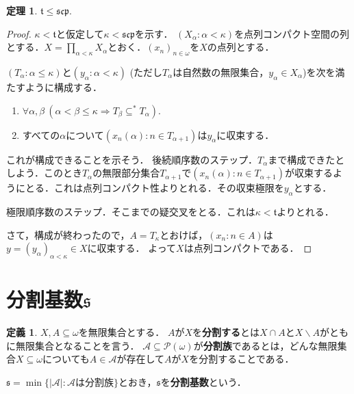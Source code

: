 \documentclass[uplatex,dvipdfmx]{jsarticle}
\newcommand{\frakt}{\mathfrak{t}}
\newcommand{\s}{\mathfrak{s}}
\newcommand{\scp}{\mathfrak{scp}}
\renewcommand\subset{\subseteq}
\renewcommand{\setminus}{\smallsetminus}
\theoremstyle{definition}
\newtheorem{thm}{定理}
\newtheorem*{defi*}{定義}
\theoremstyle{named}
\begin{document}
\begin{thm}
$\frakt \le \scp$.
\end{thm}
\begin{proof}
$\kappa < \frakt$と仮定して$\kappa < \scp$を示す．
$(X_\alpha : \alpha < \kappa)$を点列コンパクト空間の列とする．$X = \prod_{\alpha < \kappa} X_\alpha$とおく．$(x_n)_{n \in \omega}$を$X$の点列とする．

$(T_\alpha : \alpha \le \kappa)$と$(y_\alpha : \alpha < \kappa)$ (ただし$T_\alpha$は自然数の無限集合，$y_\alpha \in X_\alpha$)を次を満たすように構成する．

\begin{enumerate}
    \item $\forall \alpha, \beta \ (\alpha < \beta \le \kappa \Rightarrow T_\beta \subset^* T_\alpha)$.
    \item すべての$\alpha$について$(x_n(\alpha) : n \in T_{\alpha+1})$は$y_\alpha$に収束する．
\end{enumerate}

これが構成できることを示そう．
後続順序数のステップ．$T_\alpha$まで構成できたとしよう．このとき$T_{\alpha}$の無限部分集合$T_{\alpha+1}$で$(x_n(\alpha) : n \in T_{\alpha+1})$が収束するようにとる．これは点列コンパクト性よりとれる．その収束極限を$y_\alpha$とする．

極限順序数のステップ．そこまでの疑交叉をとる．これは$\kappa < \frakt$よりとれる．

さて，構成が終わったので，$A = T_\kappa$とおけば，$(x_n : n \in A)$は$y = (y_\alpha)_{\alpha < \kappa} \in X$に収束する．
よって$X$は点列コンパクトである．
\end{proof}

\section{分割基数$\s$}

\begin{defi*}
$X, A \subset \omega$を無限集合とする．
$A$が$X$を{\bfseries 分割する}とは$X \cap A$と$X \setminus A$がともに無限集合となることを言う．
$\mathcal{A} \subset \mathcal{P}(\omega)$が{\bfseries 分割族}であるとは，どんな無限集合$X \subset \omega$についても$A \in \mathcal{A}$が存在して$A$が$X$を分割することである．

$\s = \min \{|\mathcal{A}| : \text{$\mathcal{A}$は分割族} \}$とおき，$\s$を{\bfseries 分割基数}という．
\end{defi*}
\end{document}

